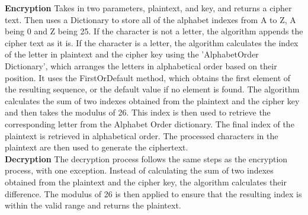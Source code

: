 \textbf{Encryption} 
Takes in two parameters, plaintext, and key, and returns a cipher text. Then uses a Dictionary to store all of the alphabet indexes from A to Z, A being 0 and Z being 25. If the character is not a letter, the algorithm appends the cipher text as it is. If the character is a letter, the algorithm calculates the index of the letter in plaintext and the cipher key using the ’AlphabetOrder Dictionary’, which arranges the letters in alphabetical order based on their position. It uses the FirstOrDefault method, which obtains the first element of the resulting sequence, or the default value if no element is found. The algorithm calculates the sum of two indexes obtained from the plaintext and the cipher key and then takes the modulus of 26. This index is then used to retrieve the corresponding letter from the Alphabet Order dictionary. The final index of the plaintext is retrieved in alphabetical order. The processed characters in the plaintext are then used to generate the ciphertext.\\

\textbf{Decryption}
The decryption process follows the same steps as the encryption process, with one exception. Instead of calculating the sum of two indexes obtained from the plaintext and the cipher key, the algorithm calculates their difference. The modulus of 26 is then applied to ensure that the resulting index is within the valid range and returns the plaintext.

